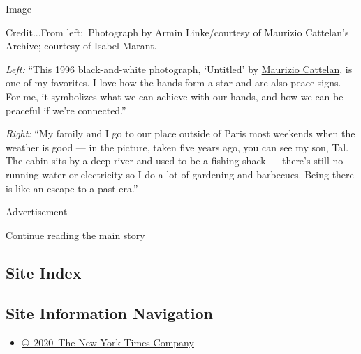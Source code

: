 Image

Credit...From left:~Photograph by Armin Linke/courtesy of Maurizio
Cattelan's Archive; courtesy of Isabel Marant.

\emph{Left:} ``This 1996 black-and-white photograph, `Untitled' by
\href{https://www.nytimes.com/2020/05/14/arts/maurizio-cattelan-bedtime-stories-virus.html}{Maurizio
Cattelan}, is one of my favorites. I love how the hands form a star and
are also peace signs. For me, it symbolizes what we can achieve with our
hands, and how we can be peaceful if we're connected.''

\emph{Right:} ``My family and I go to our place outside of Paris most
weekends when the weather is good --- in the picture, taken five years
ago, you can see my son, Tal. The cabin sits by a deep river and used to
be a fishing shack --- there's still no running water or electricity so
I do a lot of gardening and barbecues. Being there is like an escape to
a past era.''

Advertisement

\protect\hyperlink{after-bottom}{Continue reading the main story}

\hypertarget{site-index}{%
\subsection{Site Index}\label{site-index}}

\hypertarget{site-information-navigation}{%
\subsection{Site Information
Navigation}\label{site-information-navigation}}

\begin{itemize}
\tightlist
\item
  \href{https://help.nytimes.com/hc/en-us/articles/115014792127-Copyright-notice}{©~2020~The
  New York Times Company}
\end{itemize}


